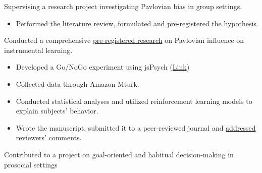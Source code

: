 \documentclass[a4paper,10pt]{article}
\begin{document}
       \item Supervising a research project investigating Pavlovian bias in group settings.
      \begin{itemize}[label=$-$]
        \item Performed the literature review, formulated and \href{https://osf.io/hkt27}{pre-registered the hypothesis}.
     \end{itemize}
      	\item Conducted a comprehensive \href{https://osf.io/rndpf}{pre-registered research} on Pavlovian influence on instrumental learning.
      	  \begin{itemize}[label=$-$]
      	
              \item Developed a Go/NoGo experiment using jsPsych (\href{https://sepsad.github.io/Orthogonalized-goNoGo-Task/}{Link}) 
              \item Collected data through Amazon Mturk.
              \item Conducted statistical analyses and utilized reinforcement learning models to explain subjects’ behavior.
              \item Wrote the manuscript, submitted it to a peer-reviewed journal and \href{https://www.webofscience.com/wos/woscc/full-record/10.1098%2Frsos.230447?type=doi&SID=EUW1ED0E40DDAW05ZudfVC7bHLN9d}{addressed reviewers' comments}.

        	\end{itemize}


      	\item Contributed to a project on goal-oriented and habitual decision-making in prosocial settings
        
\end{document}
